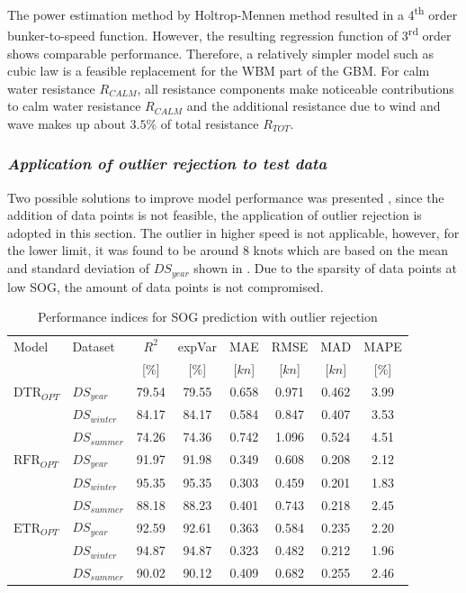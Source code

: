 The power estimation method by Holtrop-Mennen method resulted in a 4\textsuperscript{th} order bunker-to-speed function. However, the resulting regression function of 3\textsuperscript{rd} order shows comparable performance. Therefore, a relatively simpler model such as cubic law is a feasible replacement for the WBM part of the GBM. For calm water resistance $R_{CALM}$, all resistance components make noticeable contributions to calm water resistance $R_{CALM}$ and the additional resistance due to wind and wave makes up about $3.5\%$ of total resistance $R_{TOT}$.\\

\subsubsection*{\emph{Application of outlier rejection to test data}}

Two possible solutions to improve model performance was presented , since the addition of data points is not feasible, the application of outlier rejection is adopted in this section. The outlier in higher speed is not applicable, however, for the lower limit, it was found to be around 8 knots which are based on the mean and standard deviation of $DS_{year}$ shown in . Due to the sparsity of data points at low SOG, the amount of data points is not compromised.\\
\begin{table}[h!]
    \small
    \centering
    {\begin{tabular}{ l l c c c c c c }
    \hline
    Model & Dataset & $R^2$ & expVar & MAE & RMSE & MAD & MAPE \\
    & & [$\%$] & [$\%$] & [$kn$] & [$kn$] & [$kn$] & [$\%$]  \\ 
    \hline
    $\text{DTR}_{OPT}$ & $DS_{year}$ & 79.54 & 79.55 & 0.658 & 0.971 & 0.462 & 3.99 \\
    & $DS_{winter}$ & 84.17 & 84.17 & 0.584 & 0.847 & 0.407 & 3.53 \\
    & $DS_{summer}$ & 74.26 & 74.36 & 0.742  & 1.096 & 0.524 & 4.51 \\
    $\text{RFR}_{OPT}$ & $DS_{year}$  & 91.97 & 91.98 & 0.349 & 0.608 & 0.208  & 2.12 \\
    & $DS_{winter}$ & 95.35 & 95.35 & 0.303 & 0.459 & 0.201 & 1.83 \\
    & $DS_{summer}$ & 88.18 & 88.23 & 0.401 & 0.743 & 0.218 & 2.45 \\
    $\text{ETR}_{OPT}$ & $DS_{year}$ & 92.59 & 92.61 & 0.363 & 0.584 & 0.235  & 2.20 \\
    & $DS_{winter}$ & 94.87 & 94.87 &  0.323  & 0.482 & 0.212 & 1.96 \\
    & $DS_{summer}$ & 90.02 & 90.12 & 0.409 & 0.682 & 0.255  & 2.46 \\
    \hline
    \end{tabular}}
\caption{Performance indices for SOG prediction with outlier rejection}\label{tbl:sog_scores_errors_rejection}
\end{table}

